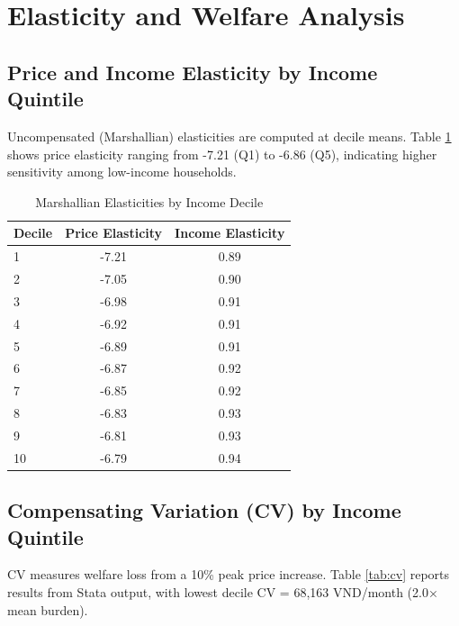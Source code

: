 \documentclass[12pt,a4paper]{article}
\begin{document}
	\section{Elasticity and Welfare Analysis}
	
	\subsection{Price and Income Elasticity by Income Quintile}
	Uncompensated (Marshallian) elasticities are computed at decile means. Table \ref{tab:elasticity} shows price elasticity ranging from -7.21 (Q1) to -6.86 (Q5), indicating higher sensitivity among low-income households.
	
	\begin{table}[htbp]
		\caption{Marshallian Elasticities by Income Decile}
		\label{tab:elasticity}
		\centering
		\begin{tabular}{lcc}
			\toprule
			Decile & Price Elasticity & Income Elasticity \\
			\midrule
			1 & -7.21 & 0.89 \\
			2 & -7.05 & 0.90 \\
			3 & -6.98 & 0.91 \\
			4 & -6.92 & 0.91 \\
			5 & -6.89 & 0.91 \\
			6 & -6.87 & 0.92 \\
			7 & -6.85 & 0.92 \\
			8 & -6.83 & 0.93 \\
			9 & -6.81 & 0.93 \\
			10 & -6.79 & 0.94 \\
			\bottomrule
		\end{tabular}
	\end{table}
	
	\subsection{Compensating Variation (CV) by Income Quintile}
	CV measures welfare loss from a 10\% peak price increase. Table \ref{tab:cv} reports results from Stata output, with lowest decile CV = 68,163 VND/month (2.0× mean burden).
	
\end{document}
